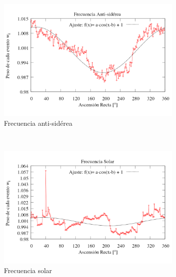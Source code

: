 		
		\begin{figure}[H]
		\centering
		\begin{subfigure}{.75\textwidth}
			\centering
			\includegraphics[width=\linewidth]{eventos_RA_ajuste_cos_antisiderea_v2.png}
			\caption{Frecuencia anti-sidérea}
			\label{fig:ajuste_antisiderea}
		\end{subfigure}\\
		\begin{subfigure}{.75\textwidth}
			\centering
			\includegraphics[width=\linewidth]{eventos_RA_ajuste_cos_solar_v3.png}
			\caption{Frecuencia solar}
			\label{fig:ajuste_solar}
		\end{subfigure}\\
		\centering
		\begin{subfigure}{.75\textwidth}
			\centering

\end{subfigure}
\end{figure}
